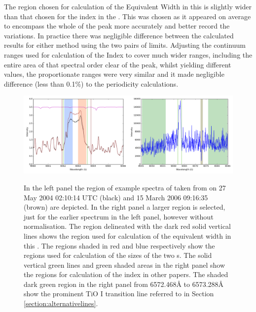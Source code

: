 The region chosen for calculation of the {\ha} Equivalent Width in this {\paperorthesis} is slightly wider than that
chosen for the {\ha} index in the \citet{suarezmascareno15}. This was chosen as it appeared on average to encompass the
whole of the {\ha} peak more accurately and better record the variations. In practice there was negligible difference
between the calculated results for either method using the two pairs of limits. Adjusting the continuum ranges used for
calculation of the {\ha} Index to cover much wider ranges, including the entire area of that spectral order clear of the
{\ha} peak, whilst yielding different values, the proportionate ranges were very similar and it made negligible
difference (less than 0.1\%) to the periodicity calculations.

\begin{figure}[!htbp]
\begin{center}
\includegraphics[scale=0.25]{Figures/harpsfirstha4.png} \\
\end{center}   
\caption{In the left panel the {\ha} region of example spectra of {\prox} taken from {\harps} on 27 May 2004 02:10:14
  UTC (black) and 15 March 2006 09:16:35 (brown) are depicted. In the right panel a larger region is selected, just for
  the earlier spectrum in the left panel, however without normalisation. The region delineated with the dark red solid
  vertical lines shows the region used for calculation of the {\ha} equivalent width in this \paperorthesis. The regions
  shaded in red and blue respectively show the regions used for calculation of the sizes of the two \horn s. The solid
  vertical green lines and green shaded areas in the right panel show the regions for calculation of the {\ha} index in
  other papers. The shaded dark green region in the right panel from 6572.468{\AA} to 6573.288{\AA} show the prominent
  TiO I transition line referred to in Section \ref{section:alternativelines}.
}
 \protect\label{fig:harpsfirstha}
\end{figure}

